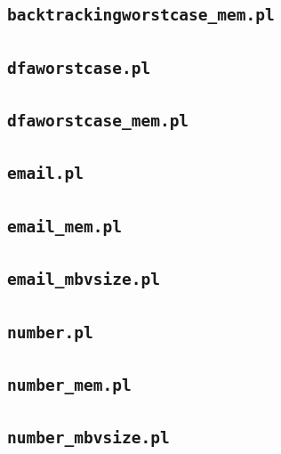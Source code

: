 \subsection*{\texttt{backtrackingworstcase\_mem.pl}}
\label{sec:backtrackingworstcase_mem.pl}



\subsection*{\texttt{dfaworstcase.pl}}
\label{sec:dfaworstcase.pl}



\subsection*{\texttt{dfaworstcase\_mem.pl}}
\label{sec:dfaworstcase_mem.pl}



\subsection*{\texttt{email.pl}}
\label{sec:email.pl}



\subsection*{\texttt{email\_mem.pl}}
\label{sec:email_mem.pl}



\subsection*{\texttt{email\_mbvsize.pl}}
\label{sec:email_mbvsize.pl}



\subsection*{\texttt{number.pl}}
\label{sec:number.pl}



\subsection*{\texttt{number\_mem.pl}}
\label{sec:number_mem.pl}



\subsection*{\texttt{number\_mbvsize.pl}}
\label{sec:number_mbvsize.pl}





